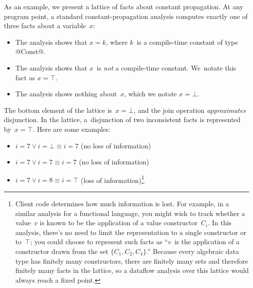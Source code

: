 \documentclass[blockstyle,preprint,natbib,nocopyrightspace]{sigplanconf}
\newcommand{\authornote}[1]{{\em #1}}
\def\authornote#1{\unskip\relax}
\newcommand{\simon}[1]{\authornote{SLPJ: #1}}
\begin{document}
As an example, 
we present a lattice of facts about constant propagation.
At any program point, a standard constant-propagation analysis
computes exactly one of three
facts about a variable~$x$:
\begin{itemize}
\item
The analysis shows that
$x = k$, where $k$~is a compile-time constant of type @Const@.
\item
The analysis shows that $x$~is \emph{not} a compile-time constant.
We~notate this fact as $x = \top$.
\item
The analysis shows nothing about~$x$, which we notate $x=\bot$.
\end{itemize}
The bottom element of the lattice is~$x=\bot$, and
the join operation \emph{approximates} disjunction.
\simon{No empahsis needed.}
In the lattice, a~disjunction of two inconsistent facts is represented by~$x=\top$.
\simon{I'd still like to give an intuition here about
\emph{why} disjunction is the key operation, and/or where is is used.
For example: ``Disjunction is to combine constant-propagation facts
arriving at a label; for example, if two blocks branch to L, and $x=7$ holds
at one branch, while $x=8$ holds at the, then the disjunction $x=7 \lor x=8$ holds
at L.  In the particular language of facts chosen above, this disjunction
approximated by $x=\top$.''  Oh, and this would be a better place for the footnote.}
Here are some examples:
\begin{itemize}
\item
$i = 7 \lor i=\bot \equiv i=7$ (no loss of information)
\item
$i = 7 \lor i= 7 \equiv  i=7$ (no loss of information)
\item
$i = 7 \lor i = 8 \equiv i = \top$ (loss of information)\footnote
{Client code determines how much information is lost.
For example, in a similar analysis for a functional language,
you might wish to track whether a value~$v$ is known to
be the application of a value constructor~$C_i$.
In this analysis, there's no need to limit the representation to a
single constructor or to~$\top$;
you could choose to represent such facts as ``$v$~is
the application of a constructor drawn from the set $\{C_1, C_2,
C_4\}$.''
Because every algebraic data type has finitely many constructors,
there are finitely many sets and therefore finitely many facts in the
lattice, so a dataflow analysis over this lattice would always reach a
fixed point.
}

\end{itemize}
\end{document}
